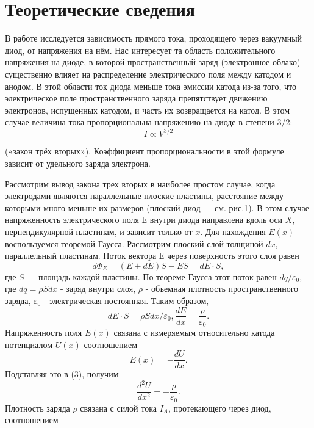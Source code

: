 \documentclass[a4paper,12pt]{article}
\begin{document}
\section{Теоретические сведения}
\par В работе исследуется зависимость прямого тока, проходящего через вакуумный диод, от напряжения на нём. Нас интересует та область положительного напряжения на диоде, в которой пространственный заряд (электронное облако) существенно влияет на распределение электрического поля между катодом и анодом. В этой области ток диода меньше тока эмиссии катода из-за того, что электрическое поле пространственного заряда препятствует движению электронов, испущенных катодом, и часть их возвращается на катод. В этом случае величина тока пропорциональна напряжению на диоде в степени 3/2:
\begin{equation}
I \propto V^{3/2}
\end{equation} 
\par («закон трёх вторых»). Коэффициент пропорциональности в этой формуле зависит от удельного заряда электрона.
\par Рассмотрим вывод закона трех вторых в наиболее простом случае, когда электродами являются параллельные плоские пластины, расстояние между которыми много меньше их размеров (плоский диод — см. рис.1). В этом случае напряженность электрического поля $Е$ внутри диода направлена вдоль оси $X$, перпендикулярной пластинам, и зависит только от $x$. Для нахождения $E(x)$ воспользуемся теоремой Гаусса. Рассмотрим плоский слой толщиной $dx$, параллельный пластинам. Поток вектора $Е$ через поверхность этого слоя равен 
\begin{equation}
d\Phi_E = (E+dE)S - ES = dE \cdot S,
\end{equation} где $S$ — площадь каждой пластины. По теореме Гаусса этот поток равен $dq/\varepsilon_0$, где $dq = \rho Sdx$ - заряд внутри слоя, $\rho$ - объемная плотность пространственного заряда, $\varepsilon_0$ - электрическая постоянная. Таким образом, 
\begin{equation}
dE\cdot S = \rho Sdx/\varepsilon_0 , \frac{dE}{dx} = \frac{\rho}{\varepsilon_0}.
\end{equation} Напряженность поля $E(x)$ связана с измеряемым относительно катода потенциалом $U(x)$ соотношением 
\begin{equation}
E(x) = - \frac{dU}{dx}.
\end{equation} Подставляя это в (3), получим
\begin{equation}
\frac{d^2U}{dx^2} = -\frac{\rho}{\varepsilon_0}.
\end{equation} Плотность заряда $\rho$ связана с силой тока $I_A$, протекающего через диод, соотношением
\end{document}

